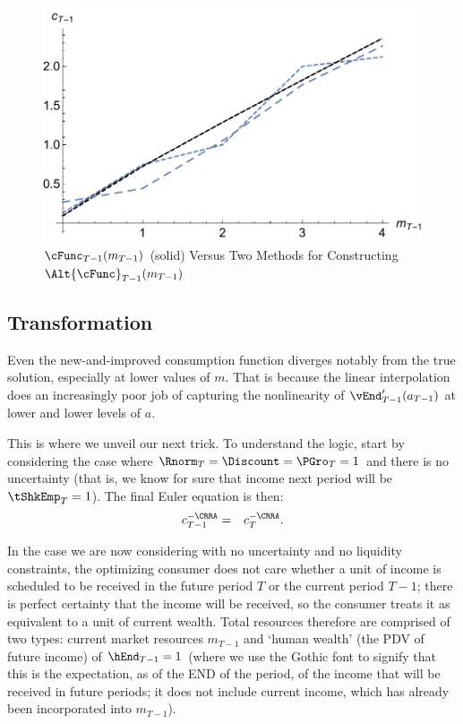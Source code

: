 \documentclass[titlepage]{\econtex}
\begin{document}
\hypertarget{PlotcTm1ABC}{}
\begin{figure}
  \includegraphics{./Figures/PlotcTm1ABC}
  \caption{$\cFunc_{T-1}({m}_{T-1})$ (solid) Versus Two Methods for Constructing $\Alt{\cFunc}_{T-1}({m}_{T-1})$}
  \label{fig:PlotcTm1ABC}
\end{figure}

\hypertarget{Transformation}{}
\subsection{Transformation}

Even the new-and-improved consumption function diverges notably from the true
solution, especially at lower values of ${m}$.  That is because the
linear interpolation does an increasingly poor job of capturing the
nonlinearity of $\vEnd_{T-1}^{\prime}({a}_{T-1})$ at
lower and lower levels of ${a}$.

This is where we unveil our next trick.  To understand the logic,
start by considering the case where $\Rnorm_{T} = \Discount =
\PGro_{T} = 1$ and there is no uncertainty
 (that is, we know for sure that income next period
will be $\tShkEmp_{T} = 1$).  The final Euler equation is then:
\begin{eqnarray}
  {c}_{T-1}^{-\CRRA} & = & {c}_{T}^{-\CRRA}.
\end{eqnarray}

In the case we are now considering with no uncertainty and no liquidity
constraints, the optimizing consumer does not care whether a unit of
income is scheduled to be received in the future period $T$ or the
current period $T-1$; there is perfect certainty that the income will
be received, so the consumer treats it as equivalent to a unit of
current wealth.  Total resources therefore are comprised of two types:
current market resources ${m}_{T-1}$ and `human wealth' (the PDV of
future income) of $\hEnd_{T-1}=1$ (where we use the Gothic font to
signify that this is the expectation, as of the END of the period, of
the income that will be received in future periods; it does not
include current income, which has already been incorporated into
${m}_{T-1}$).
\end{document}
